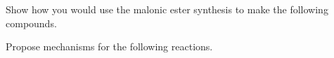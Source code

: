 \begin{example} %
    Show how you would use the malonic ester synthesis to make the following compounds.

\end{example}

\begin{example} %
    Propose mechanisms for the following reactions.
\end{example}
